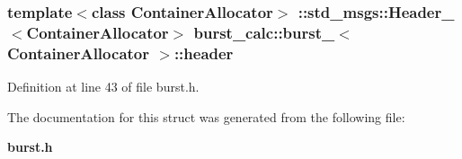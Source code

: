 \subsubsection[{header}]{\setlength{\rightskip}{0pt plus 5cm}template$<$class \-Container\-Allocator$>$ \-::std\-\_\-msgs\-::\-Header\-\_\-$<$\-Container\-Allocator$>$ {\bf burst\-\_\-calc\-::burst\-\_\-}$<$ \-Container\-Allocator $>$\-::{\bf header}}\label{structburst__calc_1_1burst___a7ca3903dce4691aa39bbefee7d58474f}


\-Definition at line 43 of file burst.\-h.



\-The documentation for this struct was generated from the following file\-:\begin{DoxyCompactItemize}
\item 
{\bf burst.\-h}\end{DoxyCompactItemize}
